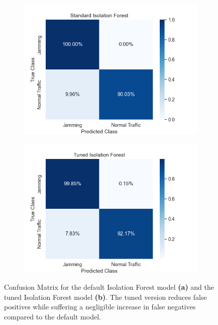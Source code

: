 \documentclass[futureinternet,article,submit,pdftex,moreauthors]{Definitions/mdpi}
\begin{document}
\begin{figure}[H]
	\centering
	\begin{subfigure}{0.49\textwidth}
		\centering
		\includegraphics[width=\textwidth]{img/ConfusionMatrixStandardIF.png}
		\caption{}
		\label{fig:ConfusionMatrixStandardIF}
	\end{subfigure}
	\hfill
	\begin{subfigure}{0.49\textwidth}
		\centering
		\includegraphics[width=\textwidth]{img/ConfusionMatrixTunedIF.png}
		\caption{}
		\label{fig:ConfusionMatrixTunedIF}
	\end{subfigure}
	\caption{Confusion Matrix for the default Isolation Forest model \textbf{(a)} and the tuned Isolation Forest model \textbf{(b)}. The tuned version reduces false positives while suffering a negligible increase in false negatives compared to the default model.}
	\label{fig:ConfusionMatrixStandardTunedIF}
\end{figure}
\end{document}
